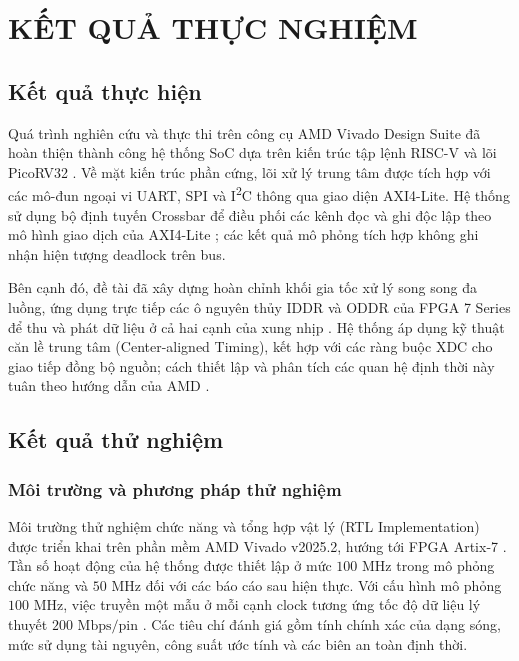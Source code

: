 \chapter{KẾT QUẢ THỰC NGHIỆM}

\section{Kết quả thực hiện}

Quá trình nghiên cứu và thực thi trên công cụ AMD Vivado Design Suite đã hoàn thiện thành công hệ thống SoC dựa trên kiến trúc tập lệnh RISC-V và lõi PicoRV32 \cite{riscv_unprivileged,picorv32_repo,amd_vivado_docs}. Về mặt kiến trúc phần cứng, lõi xử lý trung tâm được tích hợp với các mô-đun ngoại vi UART, SPI và I\textsuperscript{2}C thông qua giao diện AXI4-Lite. Hệ thống sử dụng bộ định tuyến Crossbar để điều phối các kênh đọc và ghi độc lập theo mô hình giao dịch của AXI4-Lite \cite{arm_axi4_spec,amd_axi4lite_hls,emil2023axiinterconnect}; các kết quả mô phỏng tích hợp không ghi nhận hiện tượng deadlock trên bus.

Bên cạnh đó, đề tài đã xây dựng hoàn chỉnh khối gia tốc xử lý song song đa luồng, ứng dụng trực tiếp các ô nguyên thủy IDDR và ODDR của FPGA 7 Series để thu và phát dữ liệu ở cả hai cạnh của xung nhịp \cite{amd_ug471}. Hệ thống áp dụng kỹ thuật căn lề trung tâm (Center-aligned Timing), kết hợp với các ràng buộc XDC cho giao tiếp đồng bộ nguồn; cách thiết lập và phân tích các quan hệ định thời này tuân theo hướng dẫn của AMD \cite{amd_ug903,amd_ug949}.

\section{Kết quả thử nghiệm}

\subsection{Môi trường và phương pháp thử nghiệm}
Môi trường thử nghiệm chức năng và tổng hợp vật lý (RTL Implementation) được triển khai trên phần mềm AMD Vivado v2025.2, hướng tới FPGA Artix-7  \cite{amd_vivado_docs,amd_ds180,amd_ds181}. Tần số hoạt động của hệ thống được thiết lập ở mức $100\text{ MHz}$ trong mô phỏng chức năng và $50\text{ MHz}$ đối với các báo cáo sau hiện thực. Với cấu hình mô phỏng $100\text{ MHz}$, việc truyền một mẫu ở mỗi cạnh clock tương ứng tốc độ dữ liệu lý thuyết $200\text{ Mbps/pin}$ \cite{jedec_ddr,amd_ug471}. Các tiêu chí đánh giá gồm tính chính xác của dạng sóng, mức sử dụng tài nguyên, công suất ước tính và các biên an toàn định thời.

